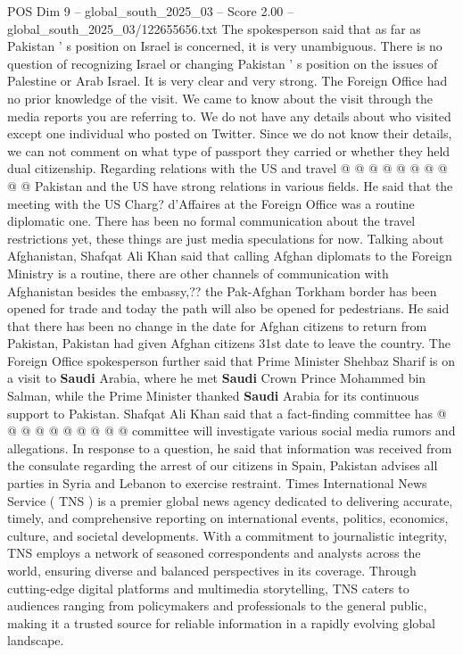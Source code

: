 \begin{textsample}{POS Dim 9 – global\_south\_2025\_03 – Score 2.00 – global\_south\_2025\_03/122655656.txt}
The spokesperson said that as far as Pakistan ' s position on Israel is concerned, it is very unambiguous.
There is no question of recognizing Israel or changing Pakistan ' s position on the issues of Palestine or Arab Israel.
It is very clear and very strong.
The Foreign Office had no prior knowledge of the visit.
We came to know about the visit through the media reports you are referring to.
We do not have any details about who visited except one individual who posted on Twitter.
Since we do not know their details, we can not comment on what type of passport they carried or whether they held dual citizenship.
Regarding relations with the US and travel @ @ @ @ @ @ @ @ @ @ Pakistan and the US have strong relations in various fields.
He said that the meeting with the US Charg? d'Affaires at the Foreign Office was a routine diplomatic one.
There has been no formal communication about the travel restrictions yet, these things are just media speculations for now.
Talking about Afghanistan, Shafqat Ali Khan said that calling Afghan diplomats to the Foreign Ministry is a routine, there are other channels of communication with Afghanistan besides the embassy,?? the Pak-Afghan Torkham border has been opened for trade and today the path will also be opened for pedestrians.
He said that there has been no change in the date for Afghan citizens to return from Pakistan, Pakistan had given Afghan citizens 31st date to leave the country.
The Foreign Office spokesperson further said that Prime Minister Shehbaz Sharif is on a visit to \textbf{Saudi} Arabia, where he met \textbf{Saudi} Crown Prince Mohammed bin Salman, while the Prime Minister thanked \textbf{Saudi} Arabia for its continuous support to Pakistan.
Shafqat Ali Khan said that a fact-finding committee has @ @ @ @ @ @ @ @ @ @ committee will investigate various social media rumors and allegations.
In response to a question, he said that information was received from the consulate regarding the arrest of our citizens in Spain, Pakistan advises all parties in Syria and Lebanon to exercise restraint.
Times International News Service ( TNS ) is a premier global news agency dedicated to delivering accurate, timely, and comprehensive reporting on international events, politics, economics, culture, and societal developments.
With a commitment to journalistic integrity, TNS employs a network of seasoned correspondents and analysts across the world, ensuring diverse and balanced perspectives in its coverage.
Through cutting-edge digital platforms and multimedia storytelling, TNS caters to audiences ranging from policymakers and professionals to the general public, making it a trusted source for reliable information in a rapidly evolving global landscape.

\end{textsample}
